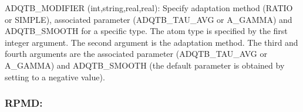 \begin{DoxyItemize}
\item {\ttfamily A\-D\-Q\-T\-B\-\_\-\-M\-O\-D\-I\-F\-I\-E\-R} (int,string,real,real)\-: Specify adaptation method ({\ttfamily R\-A\-T\-I\-O} or {\ttfamily S\-I\-M\-P\-L\-E}), associated parameter ({\ttfamily A\-D\-Q\-T\-B\-\_\-\-T\-A\-U\-\_\-\-A\-V\-G} or {\ttfamily A\-\_\-\-G\-A\-M\-M\-A}) and {\ttfamily A\-D\-Q\-T\-B\-\_\-\-S\-M\-O\-O\-T\-H} for a specific type. The atom type is specified by the first integer argument. The second argument is the adaptation method. The third and fourth arguments are the associated parameter ({\ttfamily A\-D\-Q\-T\-B\-\_\-\-T\-A\-U\-\_\-\-A\-V\-G} or {\ttfamily A\-\_\-\-G\-A\-M\-M\-A}) and {\ttfamily A\-D\-Q\-T\-B\-\_\-\-S\-M\-O\-O\-T\-H} (the default parameter is obtained by setting to a negative value).
\end{DoxyItemize}

\subsubsection*{R\-P\-M\-D\-:}


